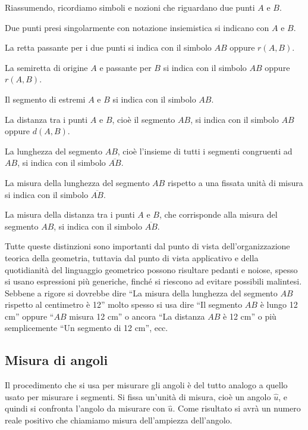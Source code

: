 Riassumendo, ricordiamo simboli e nozioni che riguardano due punti $A$ e $B$.
\begin{itemize*}
\item Due punti presi singolarmente con notazione insiemistica si indicano con $A$ e $B$.
\item La retta passante per i due punti si indica con il simbolo  $AB$ oppure $r(A,B)$.
\item La semiretta di origine $A$ e passante per $B$ si indica con il simbolo $AB$ oppure $r(A,B)$.
\item Il segmento di estremi $A$ e $B$ si indica con il simbolo $AB$.
\item La distanza tra i punti $A$ e $B$, cioè il segmento $AB$, si indica con il simbolo $AB$ oppure $d(A,B)$.
\item La lunghezza del segmento $AB$, cioè l'insieme di tutti i segmenti congruenti ad $AB$, si indica con il simbolo $\overline{AB}$.
\item La misura della lunghezza del segmento $AB$ rispetto a una fissata unità di misura si indica con il simbolo $\overline{AB}$.
\item La misura della distanza tra i punti $A$ e $B$, che corrisponde alla misura del segmento $AB$, si indica con il simbolo $\overline{AB}$.
\end{itemize*}

Tutte queste distinzioni sono importanti dal punto di vista dell'organizzazione teorica della geometria, tuttavia dal punto di vista applicativo e della quotidianità del linguaggio geometrico possono risultare pedanti e noiose, spesso si usano espressioni più generiche, finché si riescono ad evitare possibili malintesi. Sebbene a rigore si dovrebbe dire ``La misura della lunghezza del segmento $AB$ rispetto al centimetro è 12'' molto spesso si usa dire ``Il segmento $AB$ è lungo 12 cm'' oppure ``$AB$ misura 12 cm'' o ancora ``La distanza $AB$ è 12 cm'' o più semplicemente ``Un segmento di 12 cm'', ecc.

\subsection{Misura di angoli}

Il procedimento che si usa per misurare gli angoli è del tutto analogo a quello usato per misurare i segmenti. Si fissa un'unità di misura, cioè un angolo $\widehat{u}$, e quindi si confronta l'angolo da misurare con $\widehat{u}$. Come risultato si avrà un numero reale positivo che chiamiamo misura dell'ampiezza dell'angolo.

